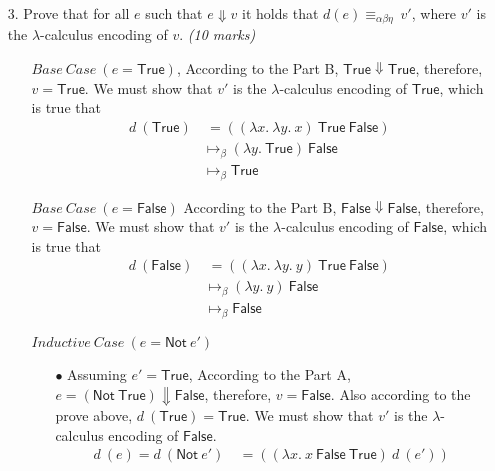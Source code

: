 \documentclass[a4paper,answers]{exam}
\begin{document}
\begin{itemize}
    \item[3.] Prove that for all $e$ such that $e \Downarrow v$ it holds that $d(e) \equiv_{\alpha \beta \eta}\ v'$, where $v'$ is the
    $\lambda$-calculus encoding of $v$. \textit{(10 marks)}
    \begin{solution}
        \small\begin{itemize}[leftmargin=*]
            \item[] $Base\ Case\ (e = \mathsf{True})$, According to the Part B, $\mathsf{True} \Downarrow \mathsf{True}$, therefore, $v = \mathsf{True}$. We must show that $v'$ is the $\lambda$-calculus encoding of $\mathsf{True}$, which is true that
            \begin{align*}
                d\ (\mathsf{True}) & \ =((\lambda x.\ \lambda y.\ x)\ \mathsf{True}\ \mathsf{False})\\
                & \mapsto_\beta  (\lambda y.\ \mathsf{True})\ \mathsf{False}\\
                & \mapsto_\beta  \mathsf{True}
            \end{align*}
            \item[] $Base\ Case\ (e = \mathsf{False})$ According to the Part B, $\mathsf{False} \Downarrow \mathsf{False}$, therefore, $v = \mathsf{False}$. We must show that $v'$ is the $\lambda$-calculus encoding of $\mathsf{False}$, which is true that
            \begin{align*}
                d\ (\mathsf{False}) & \ =((\lambda x.\ \lambda y.\ y)\ \mathsf{True}\ \mathsf{False})\\
                & \mapsto_\beta  (\lambda y.\ y)\ \mathsf{False}\\
                & \mapsto_\beta  \mathsf{False}
            \end{align*}
            \item[] $Inductive\ Case\ (e = \mathsf{Not}\ e')$
            \begin{itemize}[leftmargin=*]
                \item[$\bullet$] Assuming $e' = \mathsf{True}$, According to the Part A, $e = (\mathsf{Not}\ \mathsf{True}) \Downarrow \mathsf{False}$, therefore, $v = \mathsf{False}$. Also according to the prove above, $d\ (\mathsf{True}) = \mathsf{True}$. We must show that $v'$ is the $\lambda$-calculus encoding of $\mathsf{False}$.
                \begin{align*}
                    d\ (e) = d\ (\mathsf{Not}\ e')&\  =  ((\lambda x.\ x\ \mathsf{False\ True})\ d\ (e'))\\

\end{align*}
\end{itemize}
\end{itemize}
\end{solution}
\end{itemize}
\end{document}
